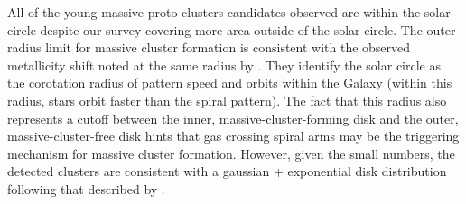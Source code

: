 




All of the young massive proto-clusters candidates observed are within the
solar circle despite our survey covering more area outside of
the solar circle.  
%
The outer radius limit for massive cluster formation is consistent with the
observed metallicity shift noted at the same radius by \citet{Lepine2011}.
They identify the solar circle as the corotation radius of pattern speed and
orbits within the Galaxy (within this radius, stars orbit faster than the
spiral pattern).  The fact that this radius also represents a cutoff between
the inner, massive-cluster-forming disk and the outer, massive-cluster-free
disk hints that gas crossing spiral arms may be the triggering mechanism for
massive cluster formation.  However, given the small numbers, the detected
clusters are consistent with a gaussian + exponential disk distribution
following that described by \citet{Wolfire2003}.  

